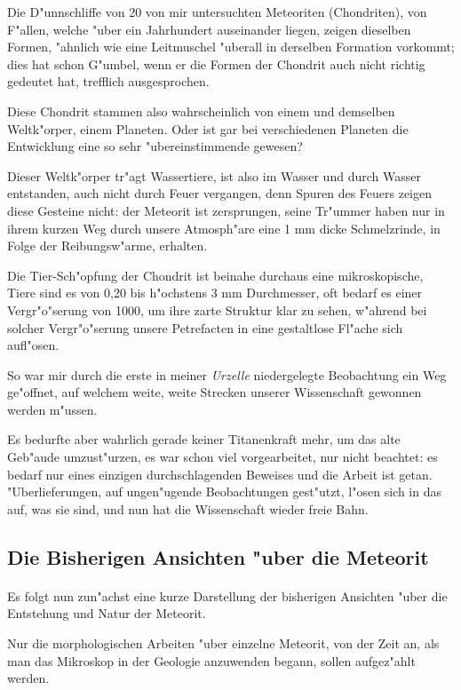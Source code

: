 \documentclass[a4paper, 11pt, oneside]{article}
\begin{document}
Die D"unnschliffe von 20 von mir untersuchten Meteoriten (Chondriten), von F"allen, welche "uber ein Jahrhundert auseinander liegen, zeigen dieselben Formen, "ahnlich wie eine Leitmuschel "uberall in derselben Formation vorkommt; dies hat schon G"umbel, wenn er die Formen der Chondrit auch nicht richtig gedeutet hat, trefflich ausgesprochen.

Diese Chondrit stammen also wahrscheinlich von einem und demselben Weltk"orper, einem Planeten. Oder ist gar bei verschiedenen Planeten die Entwicklung eine so sehr "ubereinstimmende gewesen?

Dieser Weltk"orper tr"agt Wassertiere, ist also im Wasser und durch Wasser entstanden, auch nicht durch Feuer vergangen, denn Spuren des Feuers zeigen diese Gesteine nicht: der Meteorit ist zersprungen, seine Tr"ummer haben nur in ihrem kurzen Weg durch unsere Atmosph"are eine 1 mm dicke Schmelzrinde, in Folge der Reibungsw"arme, erhalten.

Die Tier-Sch"opfung der Chondrit ist beinahe durchaus eine mikroskopische, Tiere sind es von 0,20 bis h"ochstens 3 mm Durchmesser, oft bedarf es einer Vergr"o"serung von 1000, um ihre zarte Struktur klar zu sehen, w"ahrend bei solcher Vergr"o"serung unsere Petrefacten in eine gestaltlose Fl"ache sich aufl"osen.

So war mir durch die erste in meiner \emph{Urzelle} niedergelegte Beobachtung ein Weg ge"offnet, auf welchem weite, weite Strecken unserer Wissenschaft gewonnen werden m"ussen.

Es bedurfte aber wahrlich gerade keiner Titanenkraft mehr, um das alte Geb"aude umzust"urzen, es war schon viel vorgearbeitet, nur nicht beachtet: es bedarf nur eines einzigen durchschlagenden Beweises und die Arbeit ist getan. "Uberlieferungen, auf ungen"ugende Beobachtungen gest"utzt, l"osen sich in das auf, was sie sind, und nun hat die Wissenschaft wieder freie Bahn.
\clearpage
\subsection{Die Bisherigen Ansichten "uber die Meteorit}
\paragraph{}
Es folgt nun zun"achst eine kurze Darstellung der bisherigen Ansichten "uber die Entstehung und Natur der Meteorit.

Nur die morphologischen Arbeiten "uber einzelne Meteorit, von der Zeit an, als man das Mikroskop in der Geologie anzuwenden begann, sollen aufgez"ahlt werden.
\end{document}

